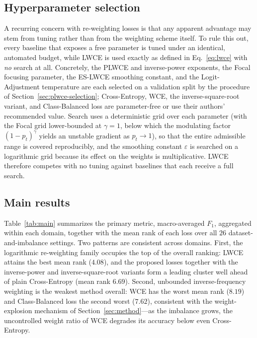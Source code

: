 \documentclass[a4paper,fleqn]{cas-sc}
\begin{document}
\subsection{Hyperparameter selection}\label{sec:hyperparam}
A recurring concern with re-weighting losses is that any apparent advantage may
stem from tuning rather than from the weighting scheme itself. To rule this out,
every baseline that exposes a free parameter is tuned under an identical, automated
budget, while LWCE is used exactly as defined in Eq.~\eqref{eq:lwce} with \emph{no}
search at all. Concretely, the PLWCE and inverse-power exponents, the Focal
focusing parameter, the ES-LWCE smoothing constant, and the Logit-Adjustment
temperature are each selected on a validation split by the procedure of
Section~\ref{sec:plwce-selection}; Cross-Entropy, WCE, the inverse-square-root
variant, and Class-Balanced loss are parameter-free or use their authors'
recommended value. Search uses a deterministic grid over each parameter (with the
Focal grid lower-bounded at $\gamma = 1$, below which the modulating factor
$(1-p_t)^{\gamma}$ yields an unstable gradient as $p_t \to 1$), so that the entire
admissible range is covered reproducibly, and the smoothing constant $\varepsilon$
is searched on a logarithmic grid because its effect on the weights is
multiplicative. LWCE therefore competes with no tuning against baselines that each
receive a full search.

\subsection{Main results}\label{sec:results}
Table~\ref{tab:main} summarizes the primary metric, macro-averaged $F_1$, aggregated
within each domain, together with the mean rank of each loss over all $26$
dataset-and-imbalance settings. Two patterns are consistent across domains. First,
the logarithmic re-weighting family occupies the top of the overall ranking: LWCE
attains the best mean rank ($4.08$), and the proposed losses together with the
inverse-power and inverse-square-root variants form a leading cluster well ahead of
plain Cross-Entropy (mean rank $6.69$). Second, unbounded inverse-frequency
weighting is the weakest method overall: WCE has the worst mean rank ($8.19$) and
Class-Balanced loss the second worst ($7.62$), consistent with the weight-explosion
mechanism of Section~\ref{sec:method}---as the imbalance grows, the uncontrolled
weight ratio of WCE degrades its accuracy below even Cross-Entropy.
\end{document}
